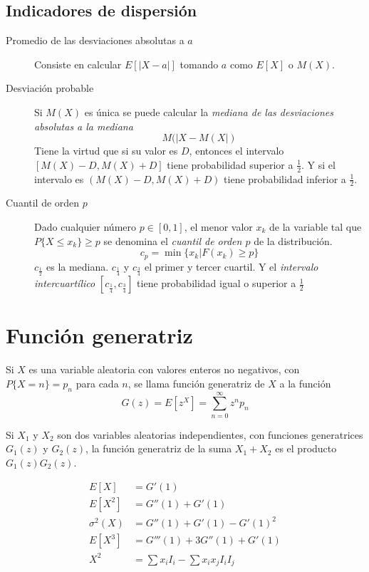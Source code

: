 \subsection{Indicadores de dispersión}

\begin{description}
    \item[Promedio de las desviaciones absolutas a $a$] Consiste en calcular $E[|X-a|]$ tomando $a$ como $E[X]$ o $M(X)$.
    \item[Desviación probable] Si $M(X)$ es única se puede calcular la \emph{mediana de las desviaciones absolutas a la mediana}
    \[M(|X-M(X|)\]
    Tiene la virtud que si su valor es $D$, entonces el intervalo $[M(X)-D,M(X)+D]$ tiene probabilidad superior a $\frac{1}{2}$. Y si el intervalo es $(M(X)-D,M(X)+D)$ tiene probabilidad inferior a $\frac{1}{2}$.
    \item[Cuantil de orden $p$] Dado cualquier número $p \in [0,1]$, el menor valor $x_k$ de la variable tal que $P\{X \leq x_k\} \geq p$ se denomina el \emph{cuantil de orden $p$} de la distribución.
    \[c_p = \min\{x_k | F(x_k) \geq p\}\]
    $c_{\frac{1}{2}}$ es la mediana. $c_{\frac{1}{4}}$ y $c_{\frac{3}{4}}$ el primer y tercer cuartil. Y el \emph{intervalo intercuartílico} $[c_{\frac{1}{4}}, c_{\frac{3}{4}}]$ tiene probabilidad igual o superior a $\frac{1}{2}$
\end{description}

\section{Función generatriz}

Si $X$ es una variable aleatoria con valores enteros no negativos, con $P\{X = n\} = p_n$ para cada $n$, se llama función generatriz de $X$ a la función
\[
G(z) = E[z^X] = \sum_{n=0}^{\infty} z^np_n
\]

Si $X_1$ y $X_2$ son dos variables aleatorias independientes, con funciones generatrices $G_1(z)$ y $G_2(z)$, la función generatriz de la suma $X_1 + X_2$ es el producto $G_1(z)G_2(z)$.

\begin{align*}
    E[X] &= G'(1) \\
    E[X^2] &= G''(1) + G'(1) \\
    \sigma^2(X) &= G''(1) + G'(1) - G'(1)^2 \\
    E[X^3] &= G'''(1) + 3G''(1) + G'(1) \\
    X^2& = \sum x_iI_i - \sum x_ix_jI_iI_j
\end{align*}
